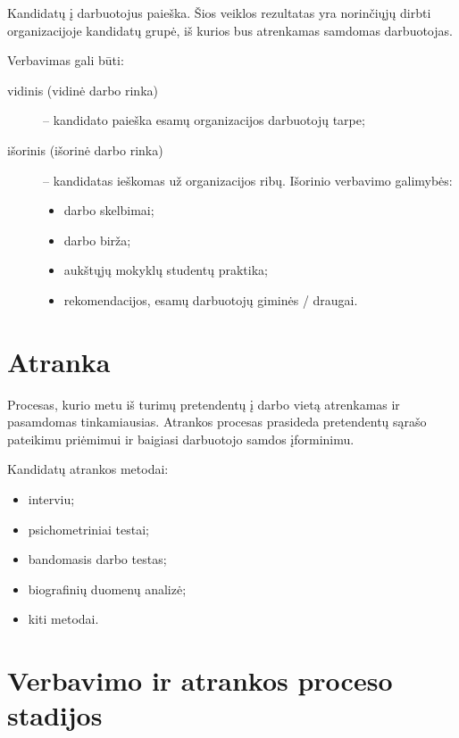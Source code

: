 \begin{defn}[Verbavimas]
  Kandidatų į darbuotojus paieška. Šios veiklos rezultatas yra norinčiųjų
  dirbti organizacijoje kandidatų grupė, iš kurios bus atrenkamas
  samdomas darbuotojas.
\end{defn}

Verbavimas gali būti:
\begin{description}
  \item[vidinis (vidinė darbo rinka)] – kandidato paieška esamų
    organizacijos darbuotojų tarpe;
  \item[išorinis (išorinė darbo rinka)] – kandidatas ieškomas už
    organizacijos ribų. Išorinio verbavimo galimybės:
    \begin{itemize}
      \item darbo skelbimai;
      \item darbo birža;
      \item aukštųjų mokyklų studentų praktika;
      \item rekomendacijos, esamų darbuotojų giminės / draugai.
    \end{itemize}
\end{description}

\section{Atranka}

\begin{defn}[Atranka]
  Procesas, kurio metu iš turimų pretendentų į darbo vietą atrenkamas
  ir pasamdomas tinkamiausias. Atrankos procesas prasideda pretendentų
  sąrašo pateikimu priėmimui ir baigiasi darbuotojo samdos įforminimu.
\end{defn}

Kandidatų atrankos metodai:
\begin{itemize}
  \item interviu;
  \item psichometriniai testai;
  \item bandomasis darbo testas;
  \item biografinių duomenų analizė;
  \item kiti metodai.
\end{itemize}

\section{Verbavimo ir atrankos proceso stadijos}

